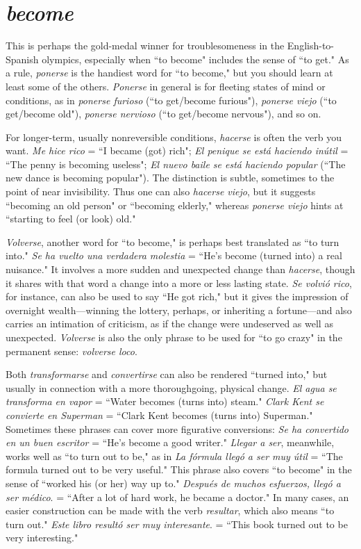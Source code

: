 \section{\emph{become}}

This is perhaps the gold-medal winner for troublesomeness
in the English-to-Spanish olympics, especially when ``to become" includes the sense of ``to get." As a rule, \emph{ponerse} is the handiest word for
``to become," but you should learn at least some of the others. \emph{Ponerse}
in general is for fleeting states of mind or conditions, as in \emph{ponerse furioso} (``to get/become furious"), \emph{ponerse viejo} (``to get/become old"),
\emph{ponerse nervioso} (``to get/become nervous"), and so on.

For longer-term, usually nonreversible conditions, \emph{hacerse} is
often the verb you want. \emph{Me hice rico} = ``I became (got) rich"; \emph{El penique se está haciendo inútil} = ``The penny is becoming useless"; \emph{El
nuevo baile se está haciendo popular} (``The new dance is becoming
popular"). The distinction is subtle, sometimes to the point of near
invisibility. Thus one can also \emph{hacerse viejo}, but it suggests ``becoming
an old person" or ``becoming elderly," whereas \emph{ponerse viejo} hints at
``starting to feel (or look) old."

\emph{Volverse}, another word for ``to become," is perhaps best translated as ``to turn into." \emph{Se ha vuelto una verdadera molestia} = ``He's
become (turned into) a real nuisance." It involves a more sudden and
unexpected change than \emph{hacerse}, though it shares with that word a
change into a more or less lasting state. \emph{Se volvió rico}, for instance,
can also be used to say ``He got rich," but it gives the impression of
overnight wealth---winning the lottery, perhaps, or inheriting a fortune---and also carries an intimation of criticism, as if the change were
undeserved as well as unexpected. \emph{Volverse} is also the only phrase to
be used for ``to go crazy" in the permanent sense: \emph{volverse loco}.

Both \emph{transformarse} and \emph{convertirse} can also be rendered
``turned into," but usually in connection with a more thoroughgoing,
physical change. \emph{El agua se transforma en vapor} = ``Water becomes
(turns into) steam." \emph{Clark Kent se convierte en Superman} = ``Clark
Kent becomes (turns into) Superman." Sometimes these phrases can
cover more figurative conversions: \emph{Se ha convertido en un buen escritor} = ``He's become a good writer." \emph{Llegar a ser}, meanwhile, works
well as ``to turn out to be," as in \emph{La fórmula llegó a ser muy útil} =
``The formula turned out to be very useful." This phrase also covers
``to become" in the sense of ``worked his (or her) way up to." \emph{Después
de muchos esfuerzos, llegó a ser médico}. = ``After a lot of hard work,
he became a doctor." In many cases, an easier construction can be
made with the verb \emph{resultar}, which also means ``to turn out." \emph{Este libro resultó ser muy interesante}. = ``This book turned out to be very
interesting."

